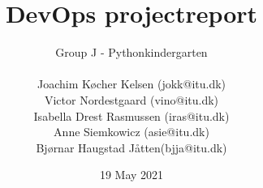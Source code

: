 \documentclass{article}
\title{DevOps projectreport}
\author{Group J - Pythonkindergarten \\ \\ Joachim Køcher Kelsen (jokk@itu.dk)\\ Victor Nordestgaard (vino@itu.dk)\\ Isabella Drest Rasmussen (iras@itu.dk) \\ Anne Siemkowicz (asie@itu.dk) \\ Bjørnar Haugstad Jåtten(bjja@itu.dk)}
\date{19 May 2021}
\begin{document}
{}

\maketitle

\newpage

\tableofcontents

\newpage



\newpage



\newpage



\newpage


\end{document}
